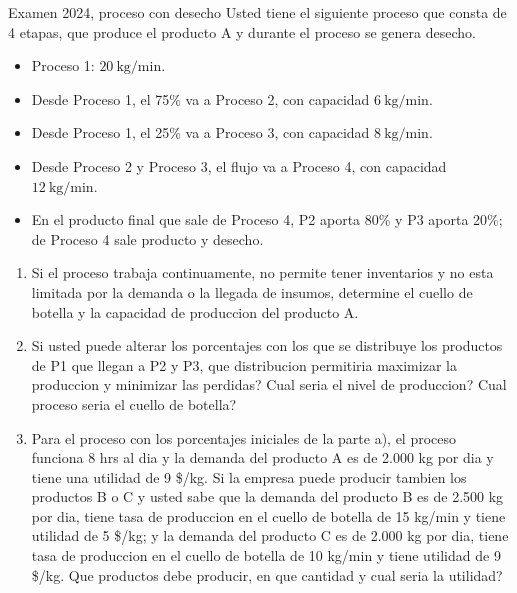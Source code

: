 \begin{enunciado}{Examen 2024, proceso con desecho}
Usted tiene el siguiente proceso que consta de 4 etapas, que produce el producto A y durante el proceso se genera desecho.

\begin{itemize}
  \item Proceso 1: $20\ \text{kg/min}$.
  \item Desde Proceso 1, el 75\% va a Proceso 2, con capacidad $6\ \text{kg/min}$.
  \item Desde Proceso 1, el 25\% va a Proceso 3, con capacidad $8\ \text{kg/min}$.
  \item Desde Proceso 2 y Proceso 3, el flujo va a Proceso 4, con capacidad $12\ \text{kg/min}$.
  \item En el producto final que sale de Proceso 4, P2 aporta 80\% y P3 aporta 20\%; de Proceso 4 sale producto y desecho.
\end{itemize}

\begin{enumerate}[label=\alph*)]
  \item Si el proceso trabaja continuamente, no permite tener inventarios y no esta limitada por la demanda o la llegada de insumos, determine el cuello de botella y la capacidad de produccion del producto A.
  \item Si usted puede alterar los porcentajes con los que se distribuye los productos de P1 que llegan a P2 y P3, que distribucion permitiria maximizar la produccion y minimizar las perdidas? Cual seria el nivel de produccion? Cual proceso seria el cuello de botella?
  \item Para el proceso con los porcentajes iniciales de la parte a), el proceso funciona 8 hrs al dia y la demanda del producto A es de 2.000 kg por dia y tiene una utilidad de 9 \$/kg. Si la empresa puede producir tambien los productos B o C y usted sabe que la demanda del producto B es de 2.500 kg por dia, tiene tasa de produccion en el cuello de botella de 15 kg/min y tiene utilidad de 5 \$/kg; y la demanda del producto C es de 2.000 kg por dia, tiene tasa de produccion en el cuello de botella de 10 kg/min y tiene utilidad de 9 \$/kg. Que productos debe producir, en que cantidad y cual seria la utilidad?
\end{enumerate}
\end{enunciado}

